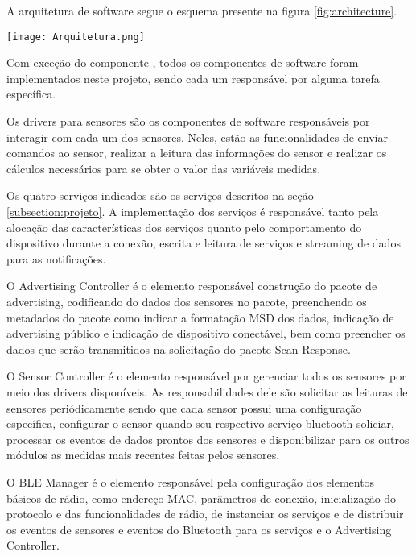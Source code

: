 A arquitetura de software segue o esquema presente na figura
\ref{fig:architecture}.

\begin{center}
	\centering 
	\texttt{[image: Arquitetura.png]}
	\label{fig:architecture}
\end{center} 

Com exceção do componente , todos os componentes de
software foram implementados neste projeto, sendo cada um responsável por alguma
tarefa específica.

Os drivers para sensores são os componentes de software responsáveis por
interagir com cada um dos sensores. Neles, estão as funcionalidades de enviar
comandos ao sensor, realizar a leitura das informações do sensor e realizar os
cálculos necessários para se obter o valor das variáveis medidas.

Os quatro serviços indicados são os serviços descritos na seção
\ref{subsection:projeto}. A implementação dos serviços é responsável tanto pela
alocação das características dos serviços quanto pelo comportamento do
dispositivo durante a conexão, escrita e leitura de serviços e streaming de
dados para as notificações.

O Advertising Controller é o elemento responsável construção do pacote de
advertising, codificando do dados dos sensores no pacote, preenchendo os
metadados do pacote como indicar a formatação MSD dos dados, indicação de
advertising público e indicação de dispositivo conectável, bem como preencher os
dados que serão transmitidos na solicitação do pacote Scan Response.

O Sensor Controller é o elemento responsável por gerenciar todos os sensores por
meio dos drivers disponíveis. As responsabilidades dele são solicitar as
leituras de sensores periódicamente sendo que cada sensor possui uma
configuração específica, configurar o sensor quando seu respectivo serviço
bluetooth soliciar, processar os eventos de dados prontos dos sensores e
disponibilizar para os outros módulos as medidas mais recentes feitas
pelos sensores.

O BLE Manager é o elemento responsável pela configuração dos elementos básicos
de rádio, como endereço MAC, parâmetros de conexão, inicialização do protocolo e
das funcionalidades de rádio, de instanciar os serviços e de distribuir os
eventos de sensores e eventos do Bluetooth para os serviços e o Advertising
Controller.

